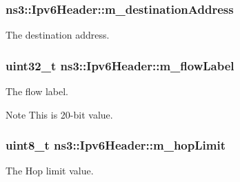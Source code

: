 \subsubsection[{\texorpdfstring{m\+\_\+destination\+Address}{m_destinationAddress}}]{ ns3\+::\+Ipv6\+Header\+::m\+\_\+destination\+Address\hspace{0.3cm}{\ttfamily [private]}}\hypertarget{classns3_1_1Ipv6Header_a3b160d334b4cb93cec9e209a815735c4}{}\label{classns3_1_1Ipv6Header_a3b160d334b4cb93cec9e209a815735c4}


The destination address. 

\subsubsection[{\texorpdfstring{m\+\_\+flow\+Label}{m_flowLabel}}]{\setlength{\rightskip}{0pt plus 5cm}uint32\+\_\+t ns3\+::\+Ipv6\+Header\+::m\+\_\+flow\+Label\hspace{0.3cm}{\ttfamily [private]}}\hypertarget{classns3_1_1Ipv6Header_a612e380567f73ca30f8bc975b286b0b7}{}\label{classns3_1_1Ipv6Header_a612e380567f73ca30f8bc975b286b0b7}


The flow label. 

\begin{DoxyNote}{Note}
This is 20-\/bit value. 
\end{DoxyNote}
\subsubsection[{\texorpdfstring{m\+\_\+hop\+Limit}{m_hopLimit}}]{\setlength{\rightskip}{0pt plus 5cm}uint8\+\_\+t ns3\+::\+Ipv6\+Header\+::m\+\_\+hop\+Limit\hspace{0.3cm}{\ttfamily [private]}}\hypertarget{classns3_1_1Ipv6Header_af75e22e0fe94f2408f000956ee435b9e}{}\label{classns3_1_1Ipv6Header_af75e22e0fe94f2408f000956ee435b9e}


The Hop limit value. 

